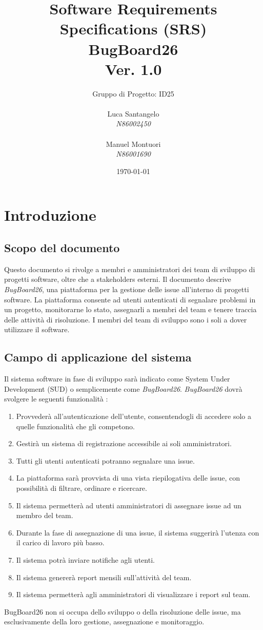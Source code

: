 \documentclass[a4paper,12pt]{article}
\title{\textbf{Software Requirements Specifications (SRS)} \\ {\Huge BugBoard26} \\ \large Ver. 1.0  }
\author{Gruppo di Progetto: ID25\\
\begin{minipage}[t]{0.45\textwidth}
\raggedright
Luca Santangelo\\
\textit{N86002450}\\
\end{minipage}
\hfill
\begin{minipage}[t]{0.45\textwidth}
\raggedleft
Manuel Montuori\\
\textit{N86001690}\\
\end{minipage}
}
\date{\today}
\begin{document}
\maketitle
\newpage
\hypersetup{linkcolor=black} %
\tableofcontents
\hypersetup{linkcolor=blue} %
\newpage

\section{Introduzione}
\subsection{Scopo del documento}
Questo documento si rivolge a membri e amministratori dei team di sviluppo
di progetti software, oltre che a stakeholders esterni. Il documento descrive \textit{BugBoard26}, una piattaforma per la gestione delle issue all'interno di progetti software.
La piattaforma consente ad utenti autenticati di segnalare problemi in un progetto, 
monitorarne lo stato, assegnarli a membri del team e tenere traccia delle attività di risoluzione. 
I membri del team di sviluppo sono i soli a dover utilizzare il software.

\subsection{Campo di applicazione del sistema}
Il sistema software in fase di sviluppo sarà indicato come System Under Development (SUD) o semplicemente come \textit{BugBoard26}.
\textit{BugBoard26} dovrà svolgere le seguenti funzionalità :
\begin{enumerate}
    \item Provvederà all'autenticazione  dell'utente, consentendogli di accedere solo a quelle funzionalità che gli competono.
    \item Gestirà un sistema di registrazione accessibile ai soli amministratori.
    \item Tutti gli utenti autenticati potranno segnalare una issue.
    \item La piattaforma sarà provvista di una vista riepilogativa  delle issue, con possibilità di filtrare, ordinare e ricercare.
    \item Il sistema permetterà ad utenti amministratori di assegnare  issue ad un membro del team. 
    \item Durante la fase di assegnazione di una issue, il sistema suggerirà l'utenza con il  carico di lavoro più basso.
    \item Il sistema potrà inviare notifiche agli utenti.
    \item Il sistema genererà report mensili sull'attività del team.
    \item Il sistema permetterà agli amministratori di visualizzare
     i report sul team.
\end{enumerate}
BugBoard26 non si occupa dello sviluppo o della risoluzione delle issue, ma esclusivamente della loro gestione, assegnazione e monitoraggio.
\end{document}
